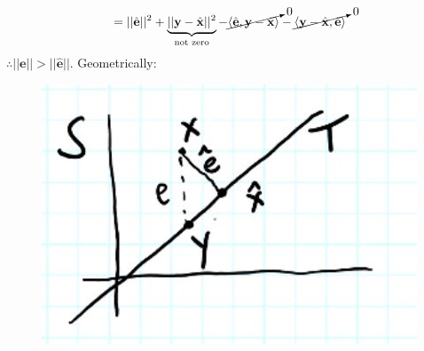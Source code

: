 \documentclass[12pt]{article}
\begin{document}
\begin{equation*}
    = ||\hat{\mathbf{e}}||^2 + \underbrace{||\mathbf{y} - \hat{\mathbf{x}}||^2}_{\text{not zero}} - \cancelto{0}{\langle \hat{\mathbf{e}}, \mathbf{y}-\hat{\mathbf{x}}\rangle} - \cancelto{0}{\langle \mathbf{y}-\hat{\mathbf{x}}, \hat{\mathbf{e}}\rangle}
\end{equation*}
$\therefore ||\mathbf{e}|| > ||\hat{\mathbf{e}}||.$
Geometrically: \\
\begin{figure}[H]
    \centering
    \includegraphics[width=0.5\linewidth]{6250-L9-IMG2.JPG}
\end{figure}
\end{document}
